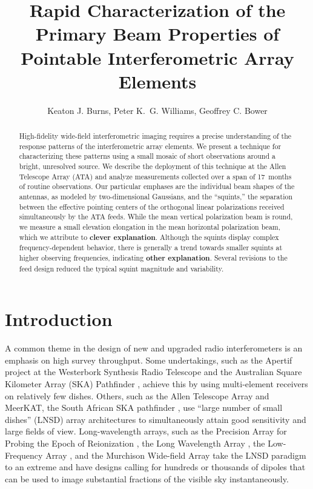 \documentclass[preprint]{aastex}
\begin{document}
\title{Rapid Characterization of the Primary Beam Properties of
  Pointable Interferometric Array Elements}
\author{Keaton J. Burns, Peter K.~G. Williams, Geoffrey C. Bower}

\begin{abstract}
  High-fidelity wide-field interferometric imaging requires a precise
  understanding of the response patterns of the interferometric array
  elements. We present a technique for characterizing these patterns
  using a small mosaic of short observations around a bright,
  unresolved source. We describe the deployment of this technique at
  the Allen Telescope Array (ATA) and analyze measurements collected
  over a span of 17~months of routine observations. Our particular
  emphases are the individual beam shapes of the antennas, as modeled
  by two-dimensional Gaussians, and the ``squints,'' the separation
  between the effective pointing centers of the orthogonal linear
  polarizations received simultaneously by the ATA feeds. While the
  mean vertical polarization beam is round, we measure a small
  elevation elongation in the mean horizontal polarization beam, which
  we attribute to \textbf{clever explanation}. Although the squints
  display complex frequency-dependent behavior, there is generally a
  trend towards smaller squints at higher observing frequencies,
  indicating \textbf{other explanation}. Several revisions to the feed
  design reduced the typical squint magnitude and variability.
\end{abstract}


\section{Introduction}\label{s.intro}

A common theme in the design of new and upgraded radio interferometers
is an emphasis on high survey throughput. Some undertakings, such as
the Apertif project at the Westerbork Synthesis Radio Telescope
\citep{theapertif} and the Australian Square Kilometer Array (SKA)
Pathfinder \citep[ASKAP;][]{theaskap}, achieve this by using
multi-element receivers on relatively few dishes. Others, such as the
Allen Telescope Array \citep[ATA;][]{Welch2009} and MeerKAT, the South
African SKA pathfinder \citep{themeerkat}, use ``large number of small
dishes'' (LNSD) array architectures to simultaneously attain good
sensitivity and large fields of view. Long-wavelength arrays, such as
the Precision Array for Probing the Epoch of Reionization
\citep[PAPER;][]{thepaper}, the Long Wavelength Array
\citep[LWA;][]{thelwa}, the Low-Frequency Array
\citep[LOFAR;][]{thelofar}, and the Murchison Wide-field Array
\citep[MWA;][]{themwa} take the LNSD paradigm to an extreme and have
designs calling for hundreds or thousands of dipoles that can be used
to image substantial fractions of the visible sky instantaneously.
\end{document}
